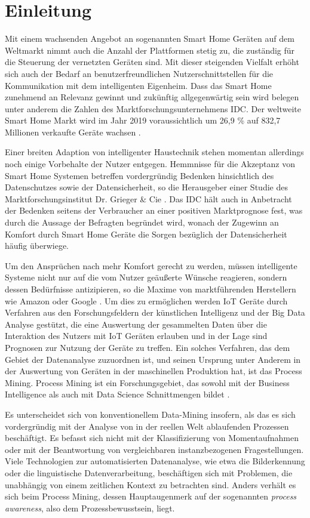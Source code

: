\chapter{Einleitung}\label{chap:introduction}
Mit einem wachsenden Angebot an sogenannten Smart Home Geräten auf dem Weltmarkt nimmt auch die Anzahl der Plattformen stetig zu, die zuständig für die Steuerung der vernetzten Geräten sind. Mit dieser steigenden Vielfalt erhöht sich auch der Bedarf an benutzerfreundlichen Nutzerschnittstellen für die Kommunikation mit dem intelligenten Eigenheim. Dass das Smart Home zunehmend an Relevanz gewinnt und zukünftig allgegenwärtig sein wird belegen unter anderem die Zahlen des Marktforschungsunternehmens IDC. Der weltweite Smart Home Markt wird im Jahr 2019 voraussichtlich um 26,9 \% auf 832,7 Millionen verkaufte Geräte wachsen \cite{IDC}.
 
Einer breiten Adaption von intelligenter Haustechnik stehen momentan allerdings noch einige Vorbehalte der Nutzer entgegen. Hemmnisse für die Akzeptanz von Smart Home Systemen betreffen vordergründig Bedenken hinsichtlich des Datenschutzes sowie der Datensicherheit, so die Herausgeber einer Studie des Marktforschungsinstitut Dr. Grieger \& Cie \cite{griegercie}. Das IDC hält auch in Anbetracht der Bedenken seitens der Verbraucher an einer positiven Marktprognose fest, was durch die Aussage der Befragten begründet wird, wonach der Zugewinn an Komfort durch Smart Home Geräte die Sorgen bezüglich der Datensicherheit häufig überwiege.
 
Um den Ansprüchen nach mehr Komfort gerecht zu werden, müssen intelligente Systeme nicht nur auf die vom Nutzer geäußerte Wünsche reagieren, sondern dessen Bedürfnisse antizipieren, so die Maxime von marktführenden Herstellern wie Amazon oder Google \cite{IoTGoogle}. Um dies zu ermöglichen werden IoT Geräte durch Verfahren aus den Forschungsfeldern der künstlichen Intelligenz und der Big Data Analyse gestützt, die eine Auswertung der gesammelten Daten über die Interaktion des Nutzers mit IoT Geräten erlauben und in der Lage sind Prognosen zur Nutzung der Geräte zu treffen. 
\newpage
Ein solches Verfahren, das dem Gebiet der Datenanalyse zuzuordnen ist, und seinen Ursprung unter Anderem in der Auswertung von Geräten in der maschinellen Produktion hat, ist das Process Mining. Process Mining ist ein Forschungsgebiet, das sowohl mit der Business Intelligence als auch mit Data Science Schnittmengen bildet \cite{PMinAction}. 

Es unterscheidet sich von konventionellem Data-Mining insofern, als das es sich vordergründig mit der Analyse von in der reellen Welt ablaufenden Prozessen beschäftigt. Es befasst sich nicht mit der Klassifizierung von Momentaufnahmen oder mit der Beantwortung von vergleichbaren instanzbezogenen Fragestellungen. Viele Technologien zur automatisierten Datenanalyse, wie etwa die Bilderkennung oder die linguistische Datenverarbeitung, beschäftigen sich mit Problemen, die unabhängig von einem zeitlichen Kontext zu betrachten sind. Anders verhält es sich beim Process Mining, dessen Hauptaugenmerk auf der sogenannten \textit{process awareness}, also dem Prozessbewusstsein, liegt.
